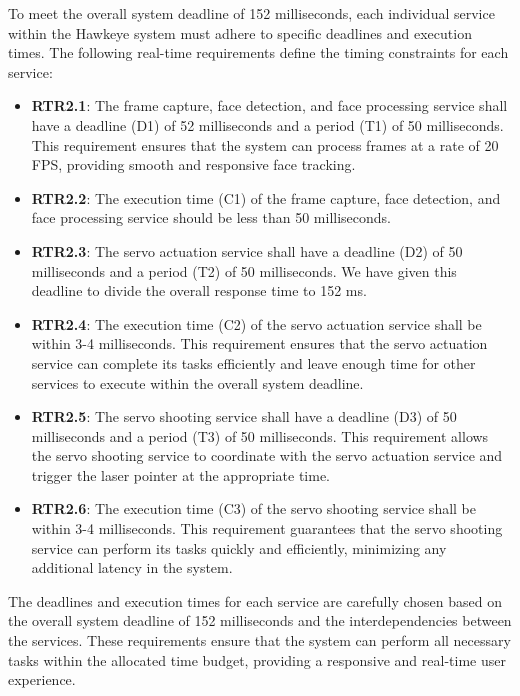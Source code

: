 \documentclass[a4paper,11pt]{article}%
\begin{document}
To meet the overall system deadline of 152 milliseconds, each individual service within the Hawkeye system must adhere to specific deadlines and execution times. The following real-time requirements define the timing constraints for each service:
\begin{itemize}
    \item \textbf{RTR2.1}: The frame capture, face detection, and face processing service shall have a deadline (D1) of 52 milliseconds and a period (T1) of 50 milliseconds. This requirement ensures that the system can process frames at a rate of 20 FPS, providing smooth and responsive face tracking.
    \item \textbf{RTR2.2}: The execution time (C1) of the frame capture, face detection, and face processing service should be less than 50 milliseconds.
    \item \textbf{RTR2.3}: The servo actuation service shall have a deadline (D2) of 50 milliseconds and a period (T2) of 50 milliseconds. We have given this deadline to divide the overall response time to 152 ms.
    \item \textbf{RTR2.4}: The execution time (C2) of the servo actuation service shall be within 3-4 milliseconds. This requirement ensures that the servo actuation service can complete its tasks efficiently and leave enough time for other services to execute within the overall system deadline.
    \item \textbf{RTR2.5}: The servo shooting service shall have a deadline (D3) of 50 milliseconds and a period (T3) of 50 milliseconds. This requirement allows the servo shooting service to coordinate with the servo actuation service and trigger the laser pointer at the appropriate time.
    \item \textbf{RTR2.6}: The execution time (C3) of the servo shooting service shall be within 3-4 milliseconds. This requirement guarantees that the servo shooting service can perform its tasks quickly and efficiently, minimizing any additional latency in the system.
\end{itemize}
The deadlines and execution times for each service are carefully chosen based on the overall system deadline of 152 milliseconds and the interdependencies between the services. These requirements ensure that the system can perform all necessary tasks within the allocated time budget, providing a responsive and real-time user experience.
\end{document}
